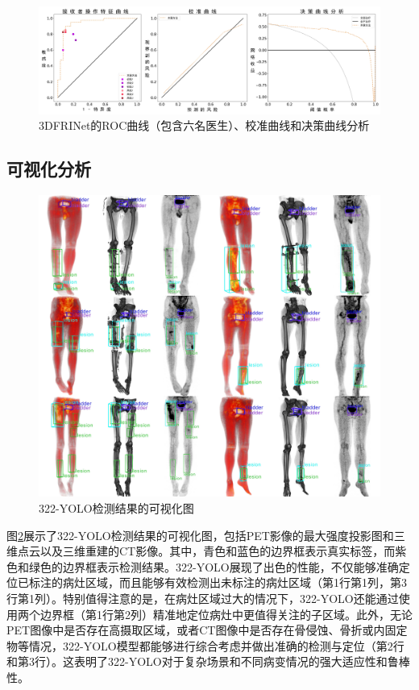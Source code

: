 \begin{figure}[htbp]
  \centering
  \includegraphics[width=\textwidth]{figures/chap04_eval.jpg}
  \caption{3DFRINet的ROC曲线（包含六名医生）、校准曲线和决策曲线分析}
  \label{fig:chap04_eval}
\end{figure}

\subsection{可视化分析}
\begin{figure}[htbp]
  \centering
  \includegraphics[width=\textwidth,height=\textheight,keepaspectratio]{figures/chap04_vis.jpg}
  \caption{322-YOLO检测结果的可视化图}
  \label{fig:chap04_vis}
\end{figure}

图\ref{fig:chap04_vis}展示了322-YOLO检测结果的可视化图，包括PET影像的最大强度投影图和三维点云以及三维重建的CT影像。其中，青色和蓝色的边界框表示真实标签，而紫色和绿色的边界框表示检测结果。322-YOLO展现了出色的性能，不仅能够准确定位已标注的病灶区域，而且能够有效检测出未标注的病灶区域（第1行第1列，第3行第1列）。特别值得注意的是，在病灶区域过大的情况下，322-YOLO还能通过使用两个边界框（第1行第2列）精准地定位病灶中更值得关注的子区域。此外，无论PET图像中是否存在高摄取区域，或者CT图像中是否存在骨侵蚀、骨折或内固定物等情况，322-YOLO模型都能够进行综合考虑并做出准确的检测与定位（第2行和第3行）。这表明了322-YOLO对于复杂场景和不同病变情况的强大适应性和鲁棒性。

